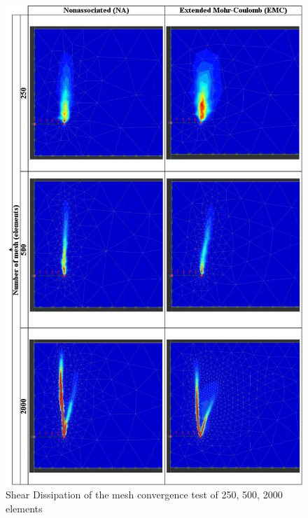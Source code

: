 \documentclass[a4paper, nobind]{templates/ociamthesis}
\begin{document}
\begin{figure}[H]
\includegraphics[width=1\linewidth]{myfigureeeeee/1} \caption{Shear Dissipation of the mesh convergence test of 250, 500, 2000 elements}\label{fig:unnamed-chunk-15}
\end{figure}
\end{document}
